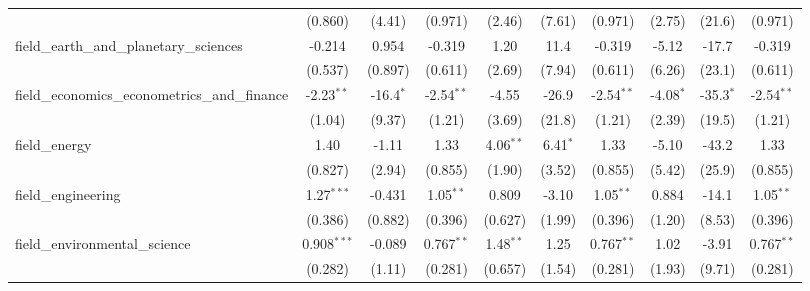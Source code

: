\begin{tabular}{lccccccccc}
                                                               & (0.860)        & (4.41)         & (0.971)        & (2.46)         & (7.61)         & (0.971)        & (2.75)         & (21.6)         & (0.971)\\   
   field\_earth\_and\_planetary\_sciences                      & -0.214         & 0.954          & -0.319         & 1.20           & 11.4           & -0.319         & -5.12          & -17.7          & -0.319\\   
                                                               & (0.537)        & (0.897)        & (0.611)        & (2.69)         & (7.94)         & (0.611)        & (6.26)         & (23.1)         & (0.611)\\   
   field\_economics\_econometrics\_and\_finance                & -2.23$^{**}$   & -16.4$^{*}$    & -2.54$^{**}$   & -4.55          & -26.9          & -2.54$^{**}$   & -4.08$^{*}$    & -35.3$^{*}$    & -2.54$^{**}$\\   
                                                               & (1.04)         & (9.37)         & (1.21)         & (3.69)         & (21.8)         & (1.21)         & (2.39)         & (19.5)         & (1.21)\\   
   field\_energy                                               & 1.40           & -1.11          & 1.33           & 4.06$^{**}$    & 6.41$^{*}$     & 1.33           & -5.10          & -43.2          & 1.33\\   
                                                               & (0.827)        & (2.94)         & (0.855)        & (1.90)         & (3.52)         & (0.855)        & (5.42)         & (25.9)         & (0.855)\\   
   field\_engineering                                          & 1.27$^{***}$   & -0.431         & 1.05$^{**}$    & 0.809          & -3.10          & 1.05$^{**}$    & 0.884          & -14.1          & 1.05$^{**}$\\   
                                                               & (0.386)        & (0.882)        & (0.396)        & (0.627)        & (1.99)         & (0.396)        & (1.20)         & (8.53)         & (0.396)\\   
   field\_environmental\_science                               & 0.908$^{***}$  & -0.089         & 0.767$^{**}$   & 1.48$^{**}$    & 1.25           & 0.767$^{**}$   & 1.02           & -3.91          & 0.767$^{**}$\\   
                                                               & (0.282)        & (1.11)         & (0.281)        & (0.657)        & (1.54)         & (0.281)        & (1.93)         & (9.71)         & (0.281)\\   

\end{tabular}
